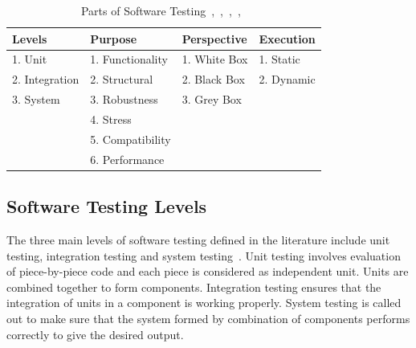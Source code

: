 \begin{table}[ht]
\caption{Parts of Software Testing~\cite{adrion1982validation},~\cite{chilenski1994applicability},~\cite{gaudel2010software},~\cite{richardson1992specification},~\cite{tracey1998automated}} %
\smallskip
\centering %
\begin{tabular}{| l | l | l | l | } %
\hline

Levels 					&Purpose		 				& Perspective			& Execution 	\\
\hline
1. Unit					&1. Functionality		& 1. White Box		& 1. Static 	\\
2. Integration	&2. Structural			& 2. Black Box		& 2. Dynamic	\\
3. System				&3. Robustness			& 3. Grey Box			&			\\
								&4. Stress					&									&			\\
								&5. Compatibility		&									&			\\
								&6. Performance			&									&			\\



\hline %
\end{tabular}
\bigskip
\label{table:addvalues} %
\end{table}


\subsection{Software Testing Levels}
The three main levels of software testing defined in the literature include unit testing, integration testing and system testing~\cite{chilenski1994applicability}. Unit testing involves evaluation of piece-by-piece code and each piece is considered as independent unit. Units are combined together to form components. Integration testing ensures that the integration of units in a component is working properly. System testing is called out to make sure that the system formed by combination of components performs correctly to give the desired output.

